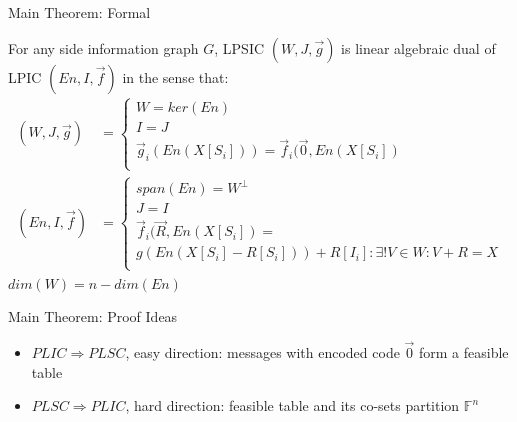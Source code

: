 \documentclass[xcolor=dvipsnames, aspectratio=169]{beamer}
\begin{document}
\begin{frame}{Main Theorem: Formal}
	\begin{theorem}
		For any side information graph $G$, LPSIC $(W, J, \overrightarrow{g})$ is linear algebraic dual of LPIC $(En, I, \overrightarrow{f})$ in the sense that:
		\begin{align*}
			(W, J, \overrightarrow{g}) &= \begin{cases}
				W = ker(En)\\
				I = J \\    
				\overrightarrow{g}_i(En(X[S_i])) = \overrightarrow{f}_i(\overrightarrow{0}, En(X[S_i])\\
			\end{cases} \\
			(En, I, \overrightarrow{f}) &= \begin{cases}
				span(En) = W^{\bot} \\
				J = I \\
				\overrightarrow{f}_i(\overrightarrow{R}, En(X[S_i]) =\\ g(En(X[S_i] - R[S_i])) + R[I_i]: \exists! V \in W: V + R = X \\
			\end{cases}
		\end{align*}
		$dim(W) = n - dim(En)$
	\end{theorem}
\end{frame}


\begin{frame}{Main Theorem: Proof Ideas}
	\begin{itemize}
		\item<1-> $PLIC \Rightarrow PLSC$, easy direction: messages with encoded code $\overrightarrow{0}$ form a feasible table
		
		\item<2-> $PLSC \Rightarrow PLIC$, hard direction: feasible table and its co-sets partition $\mathbb{F}^n$
	\end{itemize}
\end{frame}
\end{document}

